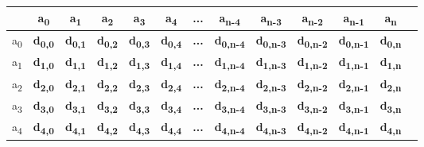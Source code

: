 \begin{figure}[h!]
	\centering
	
	
	\begin{tabular}{c|c|c|c|c|c|c|c|c|c|c|c|c}
	    & a\textsubscript{0} & a\textsubscript{1} & a\textsubscript{2} & a\textsubscript{3} & a\textsubscript{4} & ... & a\textsubscript{n-4} & a\textsubscript{n-3} & a\textsubscript{n-2} & 
	    	 a\textsubscript{n-1}  & a\textsubscript{n}\\ \hline
		a\textsubscript{0} & \textbf{d\textsubscript{0,0}} & \textbf{d\textsubscript{0,1}} & \textbf{d\textsubscript{0,2}} & 
		    \textbf{d\textsubscript{0,3}} & \textbf{d\textsubscript{0,4}} & \textbf{...} & \textbf{d\textsubscript{0,n-4}} & 
		    \textbf{d\textsubscript{0,n-3}} & \textbf{d\textsubscript{0,n-2}} & \textbf{d\textsubscript{0,n-1}}
		    & \textbf{d\textsubscript{0,n}} \\ \hline
		a\textsubscript{1} & \textbf{d\textsubscript{1,0}} & \textbf{d\textsubscript{1,1}} & \textbf{d\textsubscript{1,2}} & 
			\textbf{d\textsubscript{1,3}} & \textbf{d\textsubscript{1,4}} & \textbf{...} & \textbf{d\textsubscript{1,n-4}} & 
			\textbf{d\textsubscript{1,n-3}} & \textbf{d\textsubscript{1,n-2}} & \textbf{d\textsubscript{1,n-1}} & 
			\textbf{d\textsubscript{1,n}} \\ \hline
		a\textsubscript{2} & \textbf{d\textsubscript{2,0}} & \textbf{d\textsubscript{2,1}} & \textbf{d\textsubscript{2,2}} &
			\textbf{d\textsubscript{2,3}} & \textbf{d\textsubscript{2,4}} & \textbf{...} & \textbf{d\textsubscript{2,n-4}} & 
			\textbf{d\textsubscript{2,n-3}} & \textbf{d\textsubscript{2,n-2}} & \textbf{d\textsubscript{2,n-1}} & 
			\textbf{d\textsubscript{2,n}} \\ \hline
		a\textsubscript{3} & \textbf{d\textsubscript{3,0}} & \textbf{d\textsubscript{3,1}} & \textbf{d\textsubscript{3,2}} & 
			\textbf{d\textsubscript{3,3}} & \textbf{d\textsubscript{3,4}} & \textbf{...} & \textbf{d\textsubscript{3,n-4}} & 
			\textbf{d\textsubscript{3,n-3}} & \textbf{d\textsubscript{3,n-2}} & \textbf{d\textsubscript{3,n-1}} & 
			\textbf{d\textsubscript{3,n}} \\ \hline
		a\textsubscript{4} & \textbf{d\textsubscript{4,0}} & \textbf{d\textsubscript{4,1}} & \textbf{d\textsubscript{4,2}} & 
			\textbf{d\textsubscript{4,3}} & \textbf{d\textsubscript{4,4}} & \textbf{...} & \textbf{d\textsubscript{4,n-4}} & 
			\textbf{d\textsubscript{4,n-3}} & \textbf{d\textsubscript{4,n-2}} & \textbf{d\textsubscript{4,n-1}} & 
			\textbf{d\textsubscript{4,n}} \\ \hline
			

\end{tabular}
\end{figure}
